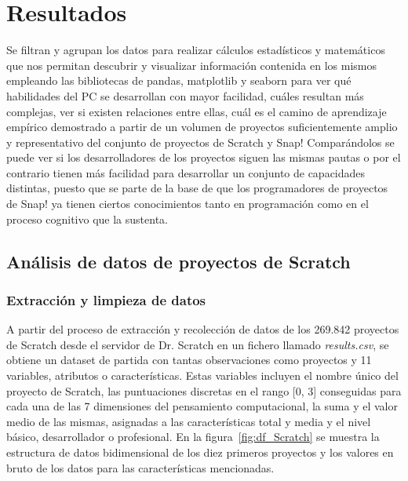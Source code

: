 \documentclass[a4paper, 12pt]{book}
\begin{document}

\cleardoublepage
\chapter{Resultados}
\label{chap:resultados}

Se filtran y agrupan los datos para realizar cálculos estadísticos y matemáticos que nos permitan descubrir y visualizar información contenida en los mismos empleando las bibliotecas de pandas, matplotlib y seaborn para ver qué habilidades del PC se desarrollan con mayor facilidad, cuáles resultan más complejas, ver si existen relaciones entre ellas, cuál es el camino de aprendizaje empírico demostrado a partir de un volumen de proyectos suficientemente amplio y representativo del conjunto de proyectos de Scratch y Snap! Comparándolos se puede ver si los desarrolladores de los proyectos siguen las mismas pautas o por el contrario tienen más facilidad para desarrollar un conjunto de capacidades distintas, puesto que se parte de la base de que los programadores de proyectos de Snap! ya tienen ciertos conocimientos tanto en programación como en el proceso cognitivo que la sustenta.

\section{Análisis de datos de proyectos de Scratch} 
\label{sec:result_scratch}

\subsection{Extracción y limpieza de datos}
\label{subsec:clean_data_Scratch}

A partir del proceso de extracción y recolección de datos de los 269.842 proyectos de Scratch desde el servidor de Dr. Scratch en un fichero llamado \emph{results.csv}, se obtiene un dataset de partida con tantas observaciones como proyectos y 11 variables, atributos o características. Estas variables incluyen el nombre único del proyecto de Scratch, las puntuaciones discretas en el rango [0, 3] conseguidas para cada una de las 7 dimensiones del pensamiento computacional, la suma y el valor medio de las mismas, asignadas a las características total y media y el nivel básico, desarrollador o profesional. En la figura~\ref{fig:df_Scratch} se muestra la estructura de datos bidimensional de los diez primeros proyectos y los valores en bruto de los datos para las características mencionadas. 
\end{document}
